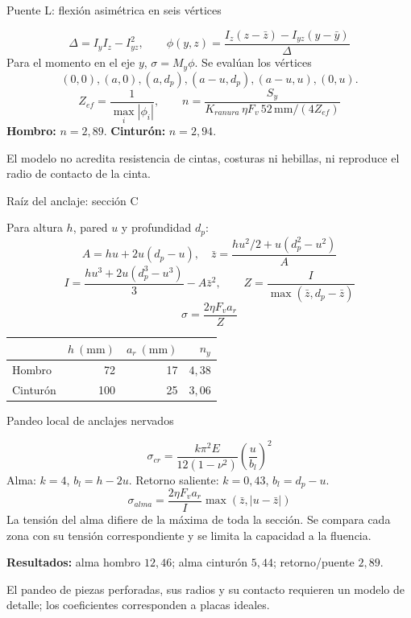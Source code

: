 \documentclass[10pt,aspectratio=169]{beamer}
\newcommand{\mm}{\,\mathrm{mm}}
\newcommand{\mcref}{Guía de diseño}
\begin{document}
\gdef\mcref{Mathcad: sección 15 / pág. 21-23}
\begin{frame}[t]{Puente L: flexión asimétrica en seis vértices}

\[
\Delta=I_yI_z-I_{yz}^2,\qquad
\phi(y,z)=\frac{I_z(z-\bar z)-I_{yz}(y-\bar y)}{\Delta}
\]
Para el momento en el eje $y$, $\sigma=M_y\phi$. Se evalúan los vértices
\[
(0,0),(a,0),(a,d_p),(a-u,d_p),(a-u,u),(0,u).
\]
\[
Z_{ef}=\frac1{\max_i|\phi_i|},\qquad
n=\frac{S_y}{K_{ranura}\,\eta F_v\,52\mm/(4Z_{ef})}
\]
\textbf{Hombro:} $n=2{,}89$. \qquad \textbf{Cinturón:} $n=2{,}94$.

El modelo no acredita resistencia de cintas, costuras ni hebillas, ni reproduce el radio de contacto de la cinta.

\end{frame}

\gdef\mcref{Mathcad: sección 16 / pág. 24-27}
\begin{frame}[t]{Raíz del anclaje: sección C}

Para altura $h$, pared $u$ y profundidad $d_p$:
\[
A=hu+2u(d_p-u),\quad
\bar z=\frac{hu^2/2+u(d_p^2-u^2)}A
\]
\[
I=\frac{hu^3+2u(d_p^3-u^3)}3-A\bar z^2,\qquad
Z=\frac I{\max(\bar z,d_p-\bar z)}
\]
\[
\sigma=\frac{2\eta F_v a_r}{Z}
\]
\begin{center}\begin{tabular}{lrrr}\toprule
 & $h\ (\mathrm{mm})$ & $a_r\ (\mathrm{mm})$ & $n_y$\\\midrule
Hombro & 72 & 17 & $4{,}38$\\
Cinturón & 100 & 25 & $3{,}06$\\\bottomrule\end{tabular}\end{center}

\end{frame}

\gdef\mcref{Mathcad: sección 16 / pág. 24-27}
\begin{frame}[t]{Pandeo local de anclajes nervados}

\[
\sigma_{cr}=\frac{k\pi^2E}{12(1-\nu^2)}\left(\frac{u}{b_l}\right)^2
\]
Alma: $k=4$, $b_l=h-2u$. Retorno saliente: $k=0{,}43$, $b_l=d_p-u$.
\[
\sigma_{alma}=\frac{2\eta F_v a_r}{I}\max(\bar z,|u-\bar z|)
\]
La tensión del alma difiere de la máxima de toda la sección. Se compara cada zona con su tensión correspondiente y se limita la capacidad a la fluencia.

\textbf{Resultados:} alma hombro $12{,}46$; alma cinturón $5{,}44$; retorno/puente $2{,}89$.

El pandeo de piezas perforadas, sus radios y su contacto requieren un modelo de detalle; los coeficientes corresponden a placas ideales.

\end{frame}
\end{document}
